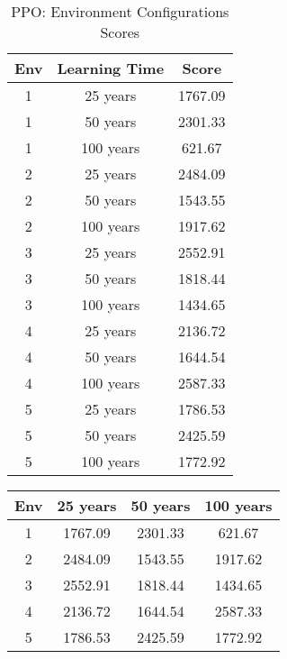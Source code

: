 \begin{table}[h]
    \centering
    \begin{tabular}{|c|c|c|}
        \hline
        Env & Learning Time & Score \\
        \hline
        1 & 25 years & 1767.09 \\
        \hline
        1 & 50 years & 2301.33 \\
        \hline
        1 & 100 years & 621.67 \\
        \hline
        2 & 25 years & 2484.09 \\
        \hline
        2 & 50 years & 1543.55 \\
        \hline
        2 & 100 years & 1917.62 \\
        \hline
        3 & 25 years & 2552.91 \\
        \hline
        3 & 50 years & 1818.44 \\
        \hline
        3 & 100 years & 1434.65 \\
        \hline
        4 & 25 years & 2136.72 \\
        \hline
        4 & 50 years & 1644.54 \\
        \hline
        4 & 100 years & 2587.33 \\
        \hline
        5 & 25 years & 1786.53 \\
        \hline
        5 & 50 years & 2425.59 \\
        \hline
        5 & 100 years & 1772.92 \\
        \hline
    \end{tabular}
    \caption{PPO: Environment Configurations Scores}
    \label{eval:ppo}
\end{table}

\begin{tabular}{|c|c|c|c|}
    \hline
    \textbf{Env} & \textbf{25 years} & \textbf{50 years} & \textbf{100 years} \\
    \hline
    1 & 1767.09 & 2301.33 & 621.67 \\
    \hline
    2 & 2484.09 & 1543.55 & 1917.62 \\
    \hline
    3 & 2552.91 & 1818.44 & 1434.65 \\
    \hline
    4 & 2136.72 & 1644.54 & 2587.33 \\
    \hline
    5 & 1786.53 & 2425.59 & 1772.92 \\
    \hline
\end{tabular}
    